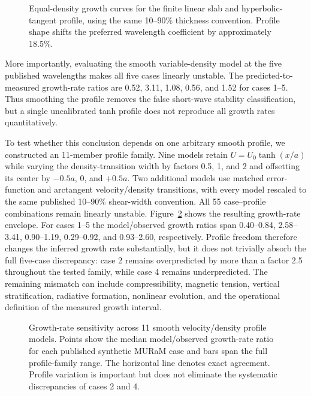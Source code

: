 \documentclass[linenumbers]{aastex7}
\begin{document}
\begin{figure}
\caption{Equal-density growth curves for the finite linear slab and hyperbolic-tangent profile, using the same 10--90\% thickness convention. Profile shape shifts the preferred wavelength coefficient by approximately 18.5\%.}
\label{fig:profile}
\end{figure}

More importantly, evaluating the smooth variable-density model at the five published wavelengths makes all five cases linearly unstable. The predicted-to-measured growth-rate ratios are 0.52, 3.11, 1.08, 0.56, and 1.52 for cases 1--5. Thus smoothing the profile removes the false short-wave stability classification, but a single uncalibrated tanh profile does not reproduce all growth rates quantitatively.

To test whether this conclusion depends on one arbitrary smooth profile, we constructed an 11-member profile family. Nine models retain $U=U_0\tanh(x/a)$ while varying the density-transition width by factors 0.5, 1, and 2 and offsetting its center by $-0.5a$, 0, and $+0.5a$. Two additional models use matched error-function and arctangent velocity/density transitions, with every model rescaled to the same published 10--90\% shear-width convention. All 55 case--profile combinations remain linearly unstable. Figure~\ref{fig:profile-family} shows the resulting growth-rate envelope. For cases 1--5 the model/observed growth ratios span 0.40--0.84, 2.58--3.41, 0.90--1.19, 0.29--0.92, and 0.93--2.60, respectively. Profile freedom therefore changes the inferred growth rate substantially, but it does not trivially absorb the full five-case discrepancy: case 2 remains overpredicted by more than a factor 2.5 throughout the tested family, while case 4 remains underpredicted. The remaining mismatch can include compressibility, magnetic tension, vertical stratification, radiative formation, nonlinear evolution, and the operational definition of the measured growth interval.

\begin{figure}
\caption{Growth-rate sensitivity across 11 smooth velocity/density profile models. Points show the median model/observed growth-rate ratio for each published synthetic MURaM case and bars span the full profile-family range. The horizontal line denotes exact agreement. Profile variation is important but does not eliminate the systematic discrepancies of cases 2 and 4.}
\label{fig:profile-family}
\end{figure}
\end{document}
